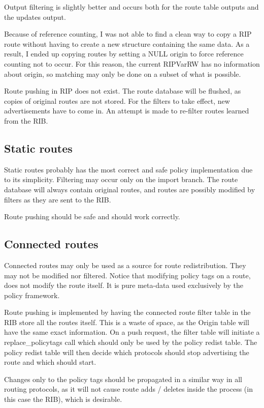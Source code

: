 \documentclass{article}
\begin{document}
Output filtering is slightly better and occurs both for the route table outputs
and the updates output.

Because of reference counting, I was not able to find a clean way to copy a RIP
route without having to create a new structure containing the same data. As a
result, I ended up copying routes by setting a NULL origin to force reference
counting not to occur. For this reason, the current RIPVarRW has no information
about origin, so matching may only be done on a subset of what is possible.

Route pushing in RIP does not exist. The route database will be flushed, as
copies of original routes are not stored. For the filters to take effect,
new advertisements have to come in. An attempt is made to re-filter routes
learned from the RIB.


\subsection{Static routes}
Static routes probably has the most correct and safe policy implementation due
to its simplicity. Filtering may occur only on the import branch. The route
database will always contain original routes, and routes are possibly modified
by filters as they are sent to the RIB.

Route pushing should be safe and should work correctly.


\subsection{Connected routes}
Connected routes may only be used as a source for route redistribution. They may
not be modified nor filtered. Notice that modifying policy tags on a route, does
not modify the route itself. It is pure meta-data used exclusively by the policy
framework.

Route pushing is implemented by having the connected route filter table in the
RIB store all the routes itself. This is a waste of space, as the Origin table
will have the same exact information. On a push request, the filter table will
initiate a replace\_policytags call which should only be used by the policy
redist table. The policy redist table will then decide which protocols should
stop advertising the route and which should start.

Changes only to the policy tags should be propagated in a similar way in all
routing protocols, as it will not cause route adds / deletes inside the process
(in this case the RIB), which is desirable. 
\end{document}
